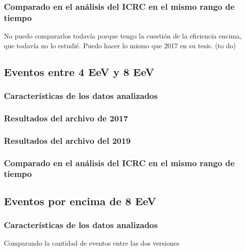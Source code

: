       \subsubsection{Comparado en el análisis del ICRC en el mismo rango de tiempo}

            No puedo compararlos todavía porque tengo la cuestión de la eficiencia encima, que todavía no lo  estudié. Puedo hacer lo mismo que 2017 en su tesis. (to do)


    \subsection{Eventos entre 4 EeV y 8 EeV }
      \subsubsection{Características de los datos analizados}
      \subsubsection{Resultados del archivo de 2017}
      \subsubsection{Resultados del archivo del 2019}
      \subsubsection{Comparado en el análisis del ICRC en el mismo rango de tiempo}


    \subsection{Eventos por encima de 8 EeV }

      \subsubsection{Características de los datos analizados}

        Comparando la cantidad de eventos entre las dos versiones %
        
